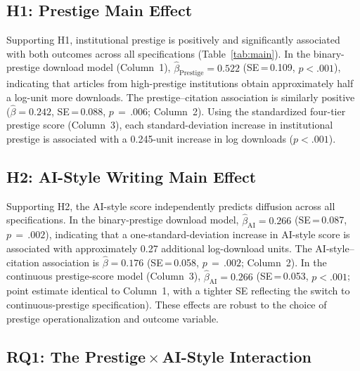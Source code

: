 \documentclass[12pt,a4paper]{article}
\begin{document}
\subsection{H1: Prestige Main Effect}

Supporting H1, institutional prestige is positively and significantly
associated with both outcomes across all specifications
(Table~\ref{tab:main}).
In the binary-prestige download model (Column~1),
$\hat{\beta}_{\text{Prestige}} = 0.522$ (SE\,=\,0.109, $p<.001$),
indicating that articles from high-prestige institutions obtain
approximately half a log-unit more downloads.
The prestige--citation association is similarly positive
($\hat{\beta} = 0.242$, SE\,=\,0.088, $p\,=\,.006$; Column~2).
Using the standardized four-tier prestige score (Column~3), each
standard-deviation increase in institutional prestige is associated
with a 0.245-unit increase in log downloads ($p<.001$).

\subsection{H2: AI-Style Writing Main Effect}

Supporting H2, the AI-style score independently predicts diffusion
across all specifications.
In the binary-prestige download model,
$\hat{\beta}_{\text{AI}} = 0.266$ (SE\,=\,0.087, $p\,=\,.002$),
indicating that a one-standard-deviation increase in AI-style score
is associated with approximately 0.27 additional log-download units.
The AI-style--citation association is
$\hat{\beta} = 0.176$ (SE\,=\,0.058, $p\,=\,.002$; Column~2).
In the continuous prestige-score model (Column~3),
$\hat{\beta}_{\text{AI}} = 0.266$ (SE\,=\,0.053, $p<.001$;
point estimate identical to Column~1, with a tighter SE reflecting the
switch to continuous-prestige specification).
These effects are robust to the choice of prestige operationalization
and outcome variable.

\subsection{RQ1: The Prestige\,$\times$\,AI-Style Interaction}
\end{document}
